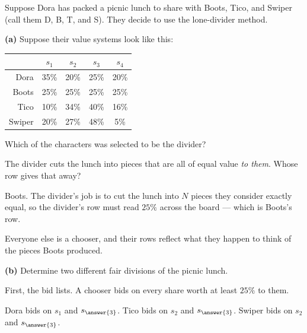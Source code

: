\documentclass[12pt]{ximera}
\begin{document}
\begin{problem}
Suppose Dora has packed a picnic lunch to share with Boots, Tico, and Swiper (call
them D, B, T, and S). They decide to use the lone-divider method.

\begin{prompt}
\textbf{(a)} Suppose their value systems look like this:

\begin{center}
\begin{tabular}{r|c|c|c|c|}
& $s_1$ & $s_2$ & $s_3$ & $s_4$ \\\hline
Dora   & 35\% & 20\% & 25\% & 20\% \\\hline
Boots  & 25\% & 25\% & 25\% & 25\% \\\hline
Tico   & 10\% & 34\% & 40\% & 16\% \\\hline
Swiper & 20\% & 27\% & 48\% &  5\% \\\hline
\end{tabular}
\end{center}

Which of the characters was selected to be the divider?

\begin{multipleChoice}
\end{multipleChoice}

\begin{hint}
The divider cuts the lunch into pieces that are all of equal value \emph{to them}.
Whose row gives that away?
\end{hint}

\begin{solution}
Boots. The divider's job is to cut the lunch into $N$ pieces they consider exactly
equal, so the divider's row must read $25\%$ across the board --- which is Boots's row.

Everyone else is a chooser, and their rows reflect what they happen to think of the
pieces Boots produced.
\end{solution}
\end{prompt}

\begin{prompt}
\textbf{(b)} Determine two different fair divisions of the picnic lunch.

First, the bid lists. A chooser bids on every share worth at least $25\%$ to them.

Dora bids on $s_1$ and $s_{\answer{3}}$. \quad
Tico bids on $s_2$ and $s_{\answer{3}}$. \quad
Swiper bids on $s_2$ and $s_{\answer{3}}$.


\end{prompt}
\end{problem}
\end{document}
